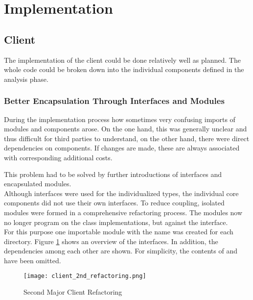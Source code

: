 \section{Implementation}

\subsection{Client}
The implementation of the client could be done relatively well as planned.
The whole code could be broken down into the individual components defined in the analysis phase.   

\subsubsection{Better Encapsulation Through Interfaces and Modules}
During the implementation process how sometimes very confusing imports of modules and components arose.
On the one hand, this was generally unclear and thus difficult for third parties to understand,
on the other hand, there were direct dependencies on components.
If changes are made, these are always associated with corresponding additional costs.

This problem had to be solved by further introductions of interfaces and encapsulated modules. \\

Although interfaces were used for the individualized types,
the individual core components did not use their own interfaces.
To reduce coupling, isolated modules were formed in a comprehensive refactoring process.
The modules now no longer program on the class implementations, but against the interface. \\

For this purpose one importable module with the name  was created for each directory.
Figure \ref{fig:client_2nd_refactoring} shows an overview of the interfaces.
In addition, the dependencies among each other are shown.
For simplicity, the contents of  and  have been omitted. \\

\begin{figure}[H]
    \centering
    \texttt{[image: client\_2nd\_refactoring.png]}
    \caption{Second Major Client Refactoring}
    \label{fig:client_2nd_refactoring}
\end{figure}

